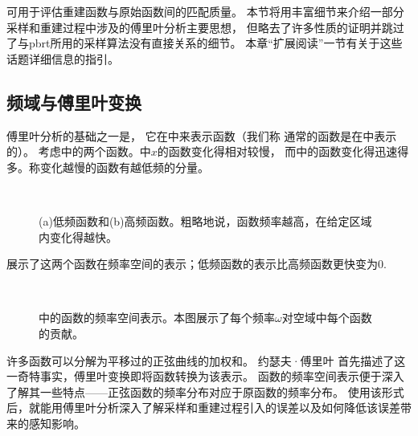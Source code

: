 可用于评估重建函数与原始函数间的匹配质量。
本节将用丰富细节来介绍一部分采样和重建过程中涉及的傅里叶分析主要思想，
但略去了许多性质的证明并跳过了与pbrt所用的采样算法没有直接关系的细节。
本章“扩展阅读”一节有关于这些话题详细信息的指引。

\subsection{频域与傅里叶变换}\label{sub:频域与傅里叶变换}
傅里叶分析的基础之一是，
它在中来表示函数（我们称
通常的函数是在中表示的）。
考虑中的两个函数。中$x$的函数变化得相对较慢，
而中的函数变化得迅速得多。称变化越慢的函数有越低频的分量。
\begin{figure}[htbp]
    \centering
    \,\,\,\,
    \caption{(a)低频函数和(b)高频函数。粗略地说，函数频率越高，在给定区域内变化得越快。}
    \label{fig:7.2}
\end{figure}

展示了这两个函数在频率空间的表示；低频函数的表示比高频函数更快变为0.
\begin{figure}[htbp]
    \centering
    \,\,\,\,
    \caption{中的函数的频率空间表示。本图展示了每个频率$\omega$对空域中每个函数的贡献。}
    \label{fig:7.3}
\end{figure}

许多函数可以分解为平移过的正弦曲线的加权和。
约瑟夫·傅里叶
首先描述了这一奇特事实，傅里叶变换即将函数转换为该表示。
函数的频率空间表示便于深入了解其一些特点——正弦函数的频率分布对应于原函数的频率分布。
使用该形式后，就能用傅里叶分析深入了解采样和重建过程引入的误差以及如何降低该误差带来的感知影响。

